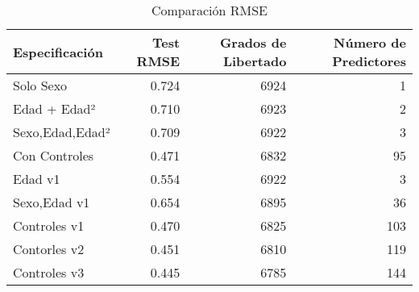 \begin{table}[ht]
\centering
\begin{tabular}{lrrr}
  \toprule
Especificación & Test RMSE & Grados de Libertado & Número de Predictores \\ 
  \midrule
Solo Sexo & 0.724 & 6924 &    1 \\ 
  Edad + Edad² & 0.710 & 6923 &    2 \\ 
  Sexo,Edad,Edad² & 0.709 & 6922 &    3 \\ 
  Con Controles & 0.471 & 6832 &   95 \\ 
  Edad v1 & 0.554 & 6922 &    3 \\ 
  Sexo,Edad v1 & 0.654 & 6895 &   36 \\ 
  Controles v1 & 0.470 & 6825 &  103 \\ 
  Contorles v2 & 0.451 & 6810 &  119 \\ 
  Controles v3 & 0.445 & 6785 &  144 \\ 
   \bottomrule
\end{tabular}
\caption{Comparación RMSE} 
\end{table}
